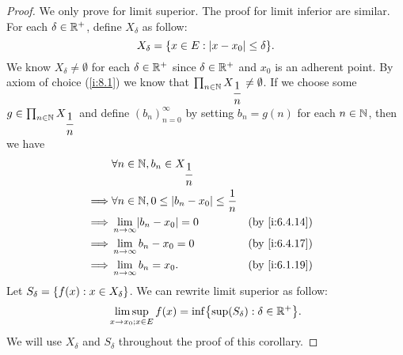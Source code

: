 \begin{proof}
  We only prove for limit superior.
  The proof for limit inferior are similar.
  For each \(\delta \in \mathbb{R}^+\), define \(X_{\delta}\) as follow:
  \[
    X_{\delta} = \set{x \in E : \abs{x - x_0} \leq \delta}.
  \]
  We know \(X_{\delta} \neq \emptyset\) for each \(\delta \in \mathbb{R}^+\) since \(\delta \in \mathbb{R}^+\) and \(x_0\) is an adherent point.
  By axiom of choice (\cref{i:8.1}) we know that \(\prod_{n \in \mathbb{N}} X_{\dfrac{1}{n}} \neq \emptyset\).
  If we choose some \(g \in \prod_{n \in \mathbb{N}} X_{\dfrac{1}{n}}\) and define \((b_n)_{n = 0}^\infty\) by setting \(b_n = g(n)\) for each \(n \in \mathbb{N}\), then we have
  \begin{align*}
             & \forall n \in \N, b_n \in X_{\dfrac{1}{n}}                                    \\
    \implies & \forall n \in \N, 0 \leq \abs{b_n - x_0} \leq \dfrac{1}{n}                    \\
    \implies & \lim_{n \to \infty} \abs{b_n - x_0} = 0                    &  & \by{i:6.4.14} \\
    \implies & \lim_{n \to \infty} b_n - x_0 = 0                          &  & \by{i:6.4.17} \\
    \implies & \lim_{n \to \infty} b_n = x_0.                             &  & \by{i:6.1.19}
  \end{align*}
  Let \(S_{\delta} = \left\lbrace f(x) : x \in X_{\delta}\right\rbrace\).
  We can rewrite limit superior as follow:
  \[
    \limsup_{x \to x_0 ; x \in E} f(x) = \inf\set{\sup(S_\delta) : \delta \in \R^+}.
  \]
  We will use \(X_{\delta}\) and \(S_{\delta}\) throughout the proof of this corollary.


\end{proof}
